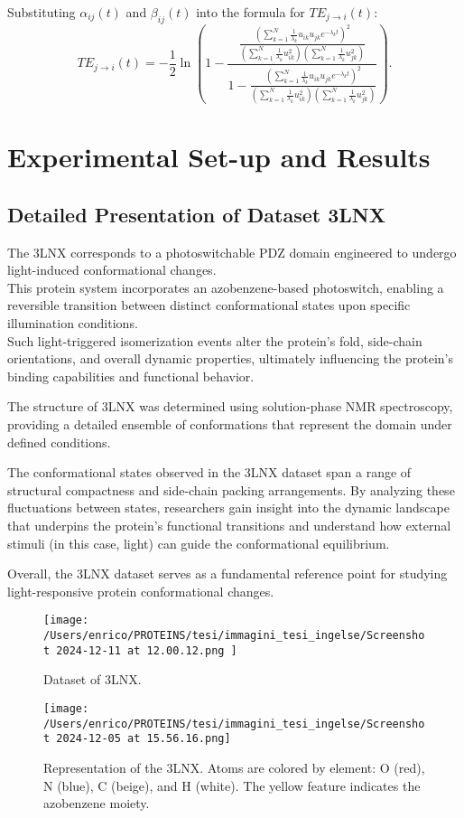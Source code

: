 \documentclass[English, Lau, oneside]{sapthesis}
\begin{document}
Substituting \(\alpha_{ij}(t)\) and \(\beta_{ij}(t)\) into the formula for \(TE_{j \to i}(t)\):
\[
TE_{j \to i}(t) = -\frac{1}{2} \ln{\left(1 - \frac{\frac{\left(\sum_{k=1}^N \frac{1}{\lambda_k} u_{ik} u_{jk} e^{-\lambda_k t}\right)^2}
{\left(\sum_{k=1}^N \frac{1}{\lambda_k} u_{ik}^2\right)\left(\sum_{k=1}^N \frac{1}{\lambda_k} u_{jk}^2\right)}}
{1 - \frac{\left(\sum_{k=1}^N \frac{1}{\lambda_k} u_{ik} u_{jk} e^{-\lambda_k t}\right)^2}
{\left(\sum_{k=1}^N \frac{1}{\lambda_k} u_{ik}^2\right)\left(\sum_{k=1}^N \frac{1}{\lambda_k} u_{jk}^2\right)}}\right)}.
\]


\chapter*{Experimental Set-up and Results}
\section*{Detailed Presentation of Dataset 3LNX}

\noindent The 3LNX corresponds to a photoswitchable PDZ domain engineered to undergo light-induced conformational changes.\\
This protein system incorporates an azobenzene-based photoswitch, enabling a reversible transition between distinct conformational states upon specific illumination conditions. \\
Such light-triggered isomerization events alter the protein’s fold, side-chain orientations, and overall dynamic properties, ultimately influencing the protein’s binding capabilities and functional behavior.

The structure of 3LNX was determined using solution-phase NMR spectroscopy, providing a detailed ensemble of conformations that represent the domain under defined conditions. 

The conformational states observed in the 3LNX dataset span a range of structural compactness and side-chain packing arrangements.  
By analyzing these fluctuations between states, researchers gain insight into the dynamic landscape that underpins the protein’s functional transitions and understand how external stimuli (in this case, light) can guide the conformational equilibrium.

Overall, the 3LNX dataset serves as a fundamental reference point for studying light-responsive protein conformational changes. 
\begin{figure}[h!]
    \centering
    \texttt{[image: /Users/enrico/PROTEINS/tesi/immagini\_tesi\_ingelse/Screenshot 2024-12-11 at 12.00.12.png
    ]}
    \caption{Dataset of 3LNX.}
\end{figure}
\begin{figure}[h!]
    \centering
    \texttt{[image: /Users/enrico/PROTEINS/tesi/immagini\_tesi\_ingelse/Screenshot 2024-12-05 at 15.56.16.png]}
    \caption{Representation of the 3LNX. Atoms are colored by element: O (red), N (blue), C (beige), and H (white). The yellow feature indicates the azobenzene moiety.}
\end{figure}
\end{document}
